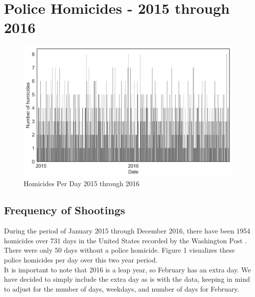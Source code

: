 \documentclass[12pt, titlepage]{article}
\begin{document}
\section{Police Homicides - 2015 through 2016}

\begin{figure}[h]
\centering
\includegraphics[width=\textwidth]{assets/homicides_frequency_(ii).png}
\caption{Homicides Per Day 2015 through 2016\cite{washington}}
\end{figure}

\subsection{Frequency of Shootings}

During the period of January 2015 through December 2016, there have been 1954 homicides over 731 days in the United States recorded by the Washington Post \cite{washington}. There were only 50 days without a police homicide. Figure 1 visualizes these police homicides per day over this two year period.\\
It is important to note that 2016 is a leap year, so February has an extra day. We have decided to simply include the extra day as is with the data, keeping in mind to adjust for the number of days, weekdays, and number of days for February.
\end{document}
